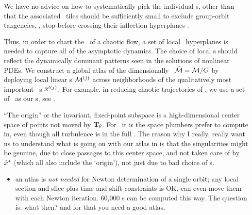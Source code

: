 We have no advice on how to
systematically pick the individual \template s, other than that the
associated \slice\ tiles should be sufficiently small to exclude
group-orbit tangencies, \ie, stop before crossing their inflection
hyperplanes .

Thus, in order to chart the \statesp\ of a chaotic flow, a set
of local \slice\ hyperplanes is needed to capture all of the asymptotic
dynamics. The choice of local \slice s should reflect the dynamically
dominant patterns seen in the solutions of nonlinear PDEs. We construct a
global atlas of the dimensionally \reducedsp\ $\hat{\cal M} = {\cal M}/G$ by
deploying local linear \slice s  ${\cal M}{}^{(j)}$ across neighborhoods of
the qualitatively most important \template\ {\cohStr s}
${\hat{x}'}{}^{(j)}$. For example, in reducing chaotic trajectories of
, we use a set of \reqva\ as our \template s, see
.

    \ifdraft\color{blue}
``The origin'' or the invariant, fixed-point subspace is a
high-dimensional center space of points not moved by $\mathbf{T}_{\theta}$. For
\pCf\ it is the space plumbers prefer to compute in, even though all
turbulence is in the full \statesp. The reason why I really, really want
us to understand what is going on with our atlas in 
is that the singularities might be genuine, due to close passages to this
center space, and not taken care of by $\hat{x}^\ast$ (which all also
include the `origin'), not just due to bad choice of \template s.
    \color{black}\fi

    \begin{itemize}
      \item an atlas is \emph{not needed} for Newton determination of a
            single orbit; any local section and slice plus time and shift
            constraints is OK, can even move them with each Newton
            iteration. 60,000 \rpo s can be computed this way.
            The question is: what then? and for that you need a good atlas.
    \end{itemize}
